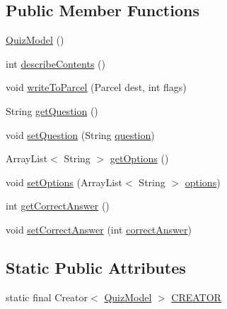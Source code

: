 \subsection*{Public Member Functions}
\begin{DoxyCompactItemize}
\item 
\hyperlink{classorg_1_1buildmlearn_1_1toolkit_1_1quiztemplate_1_1data_1_1QuizModel_a4d6c8f745dbaafa8f0210a5d36916545}{Quiz\+Model} ()
\item 
int \hyperlink{classorg_1_1buildmlearn_1_1toolkit_1_1quiztemplate_1_1data_1_1QuizModel_a5aeb97b054cab6e5dbdaa9a3cb50a12d}{describe\+Contents} ()
\item 
void \hyperlink{classorg_1_1buildmlearn_1_1toolkit_1_1quiztemplate_1_1data_1_1QuizModel_ae0f3ffade7af3cabb48ba8ed03a04ba2}{write\+To\+Parcel} (Parcel dest, int flags)
\item 
String \hyperlink{classorg_1_1buildmlearn_1_1toolkit_1_1quiztemplate_1_1data_1_1QuizModel_a9cad6dcd555ec89a70b1568ca9e70812}{get\+Question} ()
\item 
void \hyperlink{classorg_1_1buildmlearn_1_1toolkit_1_1quiztemplate_1_1data_1_1QuizModel_acb0f48c3f9e997aa36f9988784b6f93d}{set\+Question} (String \hyperlink{classorg_1_1buildmlearn_1_1toolkit_1_1quiztemplate_1_1data_1_1QuizModel_a4e88fb6898a62a5b7b7260f505a07b4b}{question})
\item 
Array\+List$<$ String $>$ \hyperlink{classorg_1_1buildmlearn_1_1toolkit_1_1quiztemplate_1_1data_1_1QuizModel_a6759a8bef73583df2648a82c03ba48f5}{get\+Options} ()
\item 
void \hyperlink{classorg_1_1buildmlearn_1_1toolkit_1_1quiztemplate_1_1data_1_1QuizModel_ad26c175a4ad673dedb3e32d24f5e64bf}{set\+Options} (Array\+List$<$ String $>$ \hyperlink{classorg_1_1buildmlearn_1_1toolkit_1_1quiztemplate_1_1data_1_1QuizModel_a33236011db95b7a1abea3b71d17df01b}{options})
\item 
int \hyperlink{classorg_1_1buildmlearn_1_1toolkit_1_1quiztemplate_1_1data_1_1QuizModel_a23884c409bbb48565820712bb676aa8a}{get\+Correct\+Answer} ()
\item 
void \hyperlink{classorg_1_1buildmlearn_1_1toolkit_1_1quiztemplate_1_1data_1_1QuizModel_a961cd7658600b1ad602ad395f3db83e0}{set\+Correct\+Answer} (int \hyperlink{classorg_1_1buildmlearn_1_1toolkit_1_1quiztemplate_1_1data_1_1QuizModel_aee2382f372a1dcd51eb3f6ce841eb646}{correct\+Answer})
\end{DoxyCompactItemize}
\subsection*{Static Public Attributes}
\begin{DoxyCompactItemize}
\item 
static final Creator$<$ \hyperlink{classorg_1_1buildmlearn_1_1toolkit_1_1quiztemplate_1_1data_1_1QuizModel}{Quiz\+Model} $>$ \hyperlink{classorg_1_1buildmlearn_1_1toolkit_1_1quiztemplate_1_1data_1_1QuizModel_a54ebe675c8f3dc6df679f60c65f703cc}{C\+R\+E\+A\+T\+OR}
\end{DoxyCompactItemize}
